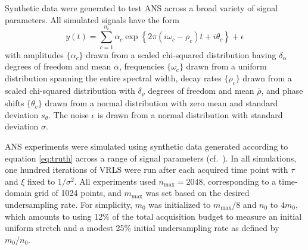 \documentclass[final,5p,times,twocolumn]{elsarticle}
\begin{document}
Synthetic data were generated to test ANS across a broad variety of
signal parameters. All simulated signals have the form
\begin{equation}
\label{eq:truth}
y(t) = \sum_{c=1}^{n_c} \alpha_c \exp\left\{
  2 \pi (i \omega_c - \rho_c) t + i \theta_c
 \right\} + \epsilon
\end{equation}
with amplitudes $\{\alpha_c\}$ drawn from a scaled chi-squared distribution
having $\delta_\alpha$ degrees of freedom and mean $\bar\alpha$,
frequencies $\{\omega_c\}$ drawn from a uniform distribution spanning
the entire spectral width, decay rates $\{\rho_c\}$ drawn from a scaled
chi-squared distribution with $\delta_\rho$ degrees of freedom and mean
$\bar\rho$, and phase shifts $\{\theta_c\}$ drawn from a normal
distribution with zero mean and standard deviation $s_\theta$.
The noise $\epsilon$ is drawn from a normal distribution with standard
deviation $\sigma$.

ANS experiments were simulated using synthetic data generated according
to equation \eqref{eq:truth} across a range of signal parameters
(cf.~). In all simulations, one hundred iterations of
VRLS were run after each acquired time point with $\tau$ and $\xi$ fixed
to $1/\sigma^2$. All experiments used $n_{\max}=2048$, corresponding to a
time-domain grid of 1024 points, and $m_{\max}$ was set based on the
desired undersampling rate. For simplicity, $m_0$ was initialized to
$m_{\max}/8$ and $n_0$ to $4 m_0$, which amounts to using 12\% of the
total acquisition budget to measure an initial uniform stretch
\cite{cullen:mrc2023} and a modest 25\% initial undersampling rate
as defined by $m_0 / n_0$.
\end{document}
